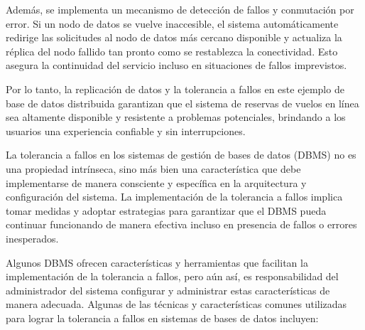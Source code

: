 Además, se implementa un mecanismo de detección de fallos y conmutación por error. Si un nodo de datos se vuelve inaccesible, el sistema automáticamente redirige las solicitudes al nodo de datos más cercano disponible y actualiza la réplica del nodo fallido tan pronto como se restablezca la conectividad. Esto asegura la continuidad del servicio incluso en situaciones de fallos imprevistos.

Por lo tanto, la replicación de datos y la tolerancia a fallos en este ejemplo de base de datos distribuida garantizan que el sistema de reservas de vuelos en línea sea altamente disponible y resistente a problemas potenciales, brindando a los usuarios una experiencia confiable y sin interrupciones.

La tolerancia a fallos en los sistemas de gestión de bases de datos (DBMS) no es una propiedad intrínseca, sino más bien una característica que debe implementarse de manera consciente y específica en la arquitectura y configuración del sistema. La implementación de la tolerancia a fallos implica tomar medidas y adoptar estrategias para garantizar que el DBMS pueda continuar funcionando de manera efectiva incluso en presencia de fallos o errores inesperados.

Algunos DBMS ofrecen características y herramientas que facilitan la implementación de la tolerancia a fallos, pero aún así, es responsabilidad del administrador del sistema configurar y administrar estas características de manera adecuada. Algunas de las técnicas y características comunes utilizadas para lograr la tolerancia a fallos en sistemas de bases de datos incluyen:

